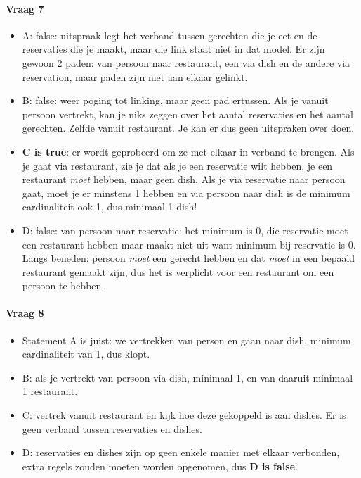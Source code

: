 \documentclass[10pt,a4paper]{report}
\begin{document}
\paragraph{Vraag 7}
\begin{itemize}
\item A: false: uitspraak legt het verband tussen gerechten die je eet en de reservaties die je maakt, maar die link staat niet in dat model. Er zijn gewoon 2 paden: van persoon naar restaurant, een via dish en de andere via reservation, maar paden zijn niet aan elkaar gelinkt.
\item B: false: weer poging tot linking, maar geen pad ertussen. Als je vanuit persoon vertrekt, kan je niks zeggen over het aantal reservaties en het aantal gerechten. Zelfde vanuit restaurant. Je kan er dus geen uitspraken over doen.
\item \textbf{C is true}: er wordt geprobeerd om ze met elkaar in verband te brengen. Als je gaat via restaurant, zie je dat als je een reservatie wilt hebben, je een restaurant \emph{moet} hebben, maar geen dish. Als je via reservatie naar persoon gaat, moet je er minstens 1 hebben en via persoon naar dish is de minimum cardinaliteit ook 1, dus minimaal 1 dish!
\item D: false: van persoon naar reservatie: het minimum is 0, die reservatie moet een restaurant hebben maar maakt niet uit want minimum bij reservatie is 0. Langs beneden: persoon \emph{moet} een gerecht hebben en dat \emph{moet} in een bepaald restaurant gemaakt zijn, dus het is verplicht voor een restaurant om een persoon te hebben.
\end{itemize}

\paragraph{Vraag 8}
\begin{itemize}
\item Statement A is juist: we vertrekken van person en gaan naar dish, minimum cardinaliteit van 1, dus klopt.
\item B: als je vertrekt van persoon via dish, minimaal 1, en van daaruit minimaal 1 restaurant.
\item C: vertrek vanuit restaurant en kijk hoe deze gekoppeld is aan dishes. Er is geen verband tussen reservaties en dishes.
\item D: reservaties en dishes zijn op geen enkele manier met elkaar verbonden, extra regels zouden moeten worden opgenomen, dus \textbf{D is false}.
\end{itemize}
\end{document}
